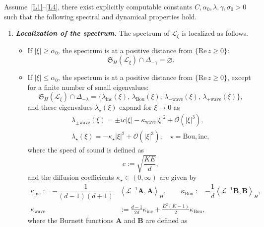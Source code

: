 \documentclass[AHL,Unicode,longabstracts,published]{cedram}
\newcommand{\Wave}{\mathrm{wave}}
\newcommand{\Inc}{\mathrm{inc}}
\newcommand{\Bou}{\mathrm{Bou}}
\newcommand{\re}{\mathrm{Re}\,}
\newcommand{\BurA}{{\mathbf{A}}}
\newcommand{\BurB}{{\mathbf{B}}}
\newcommand{\fkS}{\mathfrak{S}}
\newcommand{\OO}{\mathcal{O}}
\newcommand{\LL}{\mathcal{L}}
\newcommand{\Ss}{H}
\renewcommand*\le{\leqslant}
\renewcommand*\ge{\geqslant}
\newcommand*{\relabel}{\renewcommand{\labelenumi}{(\theenumi)}}
\newcommand*{\bfenumi}{\renewcommand*{\theenumi}{\textit{\textbf{\arabic{enumi}}}}\relabel}
\begin{document}
\begin{theo}\label{thm:spectral_study}
Assume~\eqref{L1}--\eqref{L4}, there exist {explicitly computable constants} $C, \alpha_{0}, \lambda, \gamma, \sigma_0 > 0$ such that the following spectral and dynamical properties hold.
\begin{enumerate}\bfenumi
\item\label{theo1.8.1}\textit{\textbf{Localization of the spectrum.}} The spectrum of $\LL_\xi$ is localized as follows.
\begin{itemize}
\item If $|\xi| \ge \alpha_{0}$, the spectrum is at a positive distance from $\{ \re z \ge 0 \}$:
\[
\fkS_{\Ss}\left(\LL_{\xi}\right) \cap \Delta_{-\gamma} = \varnothing.
\]
\item If $|\xi| \le \alpha_{0}$, the spectrum is at a positive distance from $\{ \re z \ge 0 \}$, except for a finite number of small eigenvalues:
\[
\fkS_{\Ss}(\LL_{\xi}) \cap \Delta_{-\lambda} = \big\{ \lambda_\Inc(\xi), \, \lambda_\Bou(\xi), \, \lambda_{- \Wave}(\xi), \,\lambda_{+\Wave}(\xi) \big\},
\]
and these eigenvalues $\lambda_\star(\xi)$ expand for $\xi \to 0$ as
\begin{subequations}\label{eq:lambda_star}
\begin{gather}
\lambda_{\pm \Wave}(\xi) = \pm i c | \xi | - \kappa_\Wave | \xi |^2 + \OO\left(| \xi |^3 \right),\\
\lambda_{\star}(\xi) = - \kappa_\star | \xi |^2 + \OO\left(| \xi |^3 \right), \quad \star = \Bou, \Inc,
\end{gather}
\end{subequations}
where the speed of sound is defined as
\begin{equation}\label{eq:speed_sound}
c:=\sqrt{\frac{KE}{d}},
\end{equation}
and the diffusion coefficients $\kappa_\star \in (0, \infty)$ are given by
\begin{equation}\label{eq:kappa}
\begin{split}
\kappa_\Inc := - \dfrac{1}{(d-1)(d+1) } &\left \langle \LL^{-1} \BurA,\BurA \right \rangle_{\Ss},
\qquad \kappa_\Bou := - \dfrac{1}{d} \left \langle \LL^{-1} \BurB, \BurB \right \rangle_{\Ss},\\
\kappa_\Wave &:= \frac{d-1}{2 d} \kappa_\Inc + \frac{E^2(K-1)}{2} \kappa_\Bou,
\end{split}
\end{equation}
where the Burnett functions $\BurA $ and $\BurB $ are defined as

\end{itemize}
\end{enumerate}
\end{theo}
\end{document}
